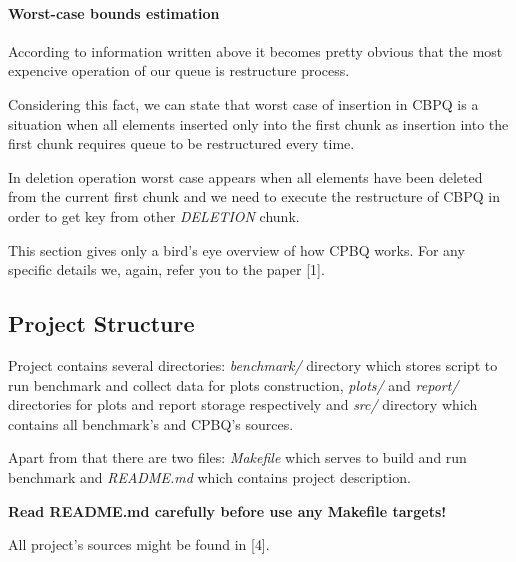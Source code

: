 \documentclass{article}
\begin{document}
\paragraph{Worst-case bounds estimation}\mbox{}\par 
According to information written above it becomes pretty obvious that the most expencive operation of our queue is restructure process.\par
Considering this fact, we can state that worst case of insertion in CBPQ is a situation when all elements inserted only into the first chunk as insertion into the first chunk requires queue to be restructured every time.\par
In deletion operation worst case appears when all elements have been deleted from the current first chunk and we need to execute the restructure of CBPQ in order to get key from other \emph{DELETION} chunk.\newline\par
This section gives only a bird's eye overview of how CPBQ works. For any specific details we, again, refer you to the paper [1].

\subsection{Project Structure}
Project contains several directories: \textit{benchmark/} directory which stores script to run benchmark and collect data for plots construction, \textit{plots/} and \textit{report/} directories for plots and report storage respectively and \textit{src/} directory which contains all benchmark's and CPBQ's sources.\par
Apart from that there are two files: \textit{Makefile} which serves to build and run benchmark and \textit{README.md} which contains project description.\par
\textbf{Read README.md carefully before use any Makefile targets!}\par
All project's sources might be found in [4].
\end{document}
